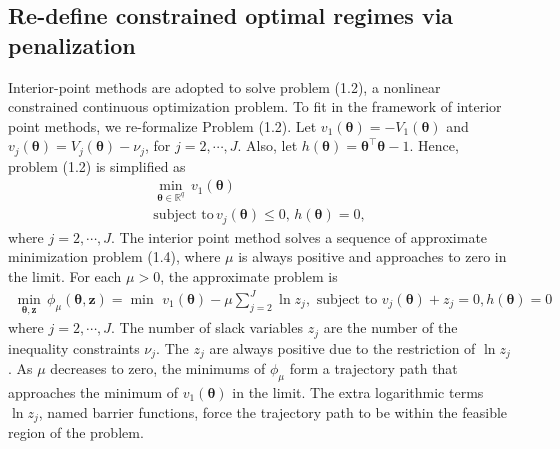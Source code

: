 \documentclass{article}
\newcommand{\itl}{\intercal}
\newcommand{\bs}{ \boldsymbol}
\newcommand{\mb}{\mathbb}
\newcommand{\lt}{\left}
\newcommand{\rt}{\right}
\begin{document}
\subsection{Re-define constrained optimal regimes  via penalization} %
 Interior-point methods are adopted to solve problem (1.2), a nonlinear constrained continuous optimization problem. To fit in the framework of interior point methods, we re-formalize Problem (1.2). Let $v_1\lt(\bs{\theta}\rt)=- V_1\lt(\bs{\theta}\rt)$ and  $v_j\lt(\bs{\theta}\rt) = V_j\lt(\bs{\theta}\rt) - \nu_j$, for $j = 2, \cdots, J$. Also, let $h\lt(\bs{\theta}\rt) = \bs{\theta}^{\itl}\bs{\theta}-1$. Hence,  problem (1.2) is simplified as
 \begin{equation}
 \begin{gathered}
 \min_{\bs{\theta} \in \mb{R}^q} \, v_1(\bs{\theta}) \\ 
 \text{subject to}  \, v_j(\bs{\theta}) \le 0,\, h\lt(\bs{\theta}\rt)=0,
 \end{gathered}
 \end{equation}
 where  $j = 2, \cdots, J$. The interior point method solves a sequence of approximate minimization problem (1.4), where $\mu$ is always positive and approaches to zero in the limit. For each $\mu >0$, the approximate problem is 
 \begin{equation}
 \begin{gathered}
 \min_{\bs{\theta}, \bs{z}} \, \phi_{\mu}(\bs{\theta}, \bs{z}) = \min \,\,v_1(\bs{\theta}) - \mu \sum_{j=2}^J \ln z_j, \text{ subject to } v_j(\bs{\theta})  + z_j = 0, h\lt(\bs{\theta}\rt) = 0
 \end{gathered}
 \end{equation}
where  $j = 2, \cdots, J$. The number of slack variables $z_j$ are the number of the inequality constraints $\nu_j$. The $z_j$ are always positive due to the restriction of $\ln z_j$. As $\mu$ decreases to zero, the minimums of $\phi_\mu$ form a trajectory path that approaches the minimum of $v_1(\bs{\theta})$ in the limit. The extra logarithmic terms $\ln z_j$, named barrier functions, force the trajectory path to be within the feasible region of the problem.\\
 
\end{document}
